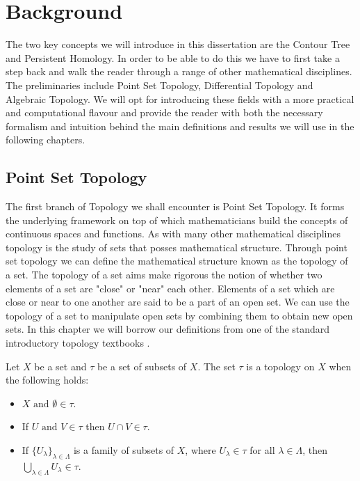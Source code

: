 \chapter{Background}
\label{chapter2}

The two key concepts we will introduce in this dissertation are the Contour Tree and Persistent Homology. In order to be able to do this we have to first take a step back and walk the reader through a range of other mathematical disciplines. The preliminaries include Point Set Topology, Differential Topology and Algebraic Topology. We will opt for introducing these fields with a more practical and computational flavour and provide the reader with both the necessary formalism and intuition behind the main definitions and results we will use in the following chapters.

\section{Point Set Topology}

The first branch of Topology we shall encounter is Point Set Topology. It forms the underlying framework on top of which mathematicians build the concepts of continuous spaces and functions. As with many other mathematical disciplines topology is the study of sets that posses mathematical structure. Through point set topology we can define the mathematical structure known as the topology of a set. The topology of a set aims make rigorous the notion of whether two elements of a set are "close" or "near" each other. Elements of a set which are close or near to one another are said to be a part of an open set. We can use the topology of a set to manipulate open sets by combining them to obtain new open sets. In this chapter we will borrow our definitions from one of the standard introductory topology textbooks \cite{intro-topo}.

\begin{defn} Let $X$ be a set and $\tau$ be a set of subsets of $X$. The set $\tau$ is a topology on $X$ when the following holds:  \end{defn}

\begin{itemize}
    \item $X \text{ and } \emptyset \in \tau$.
    \item If $U \text{ and } V \in \tau$ then $U \cap V \in \tau$.
    \item If $\{U_\lambda\}_{\lambda \in \Lambda}$ is a family of subsets of $X$, where $U_\lambda \in \tau$ for all $\lambda \in \Lambda$, then
        $\bigcup_{\lambda \in \Lambda}{U_\lambda} \in \tau$.
\end{itemize}

